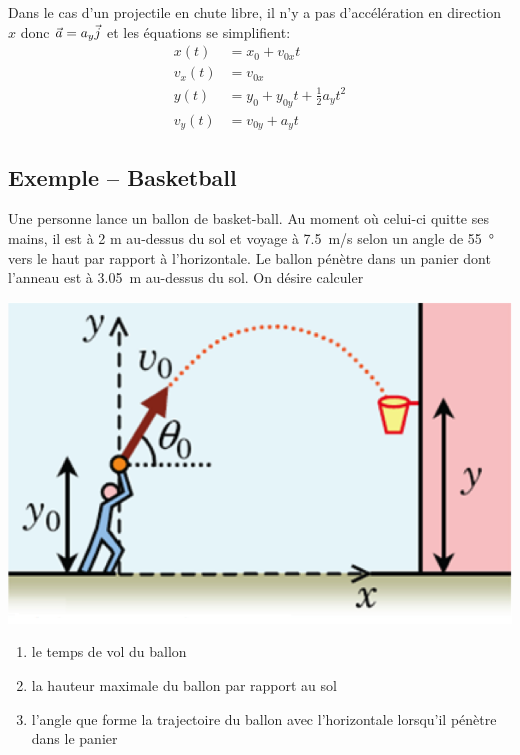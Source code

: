 Dans le cas d'un projectile en chute libre, il n'y a pas d'accélération en
direction $x$ donc $\vec{a} = a_y \vec{j}$ et les équations se simplifient:
\begin{align*}
  x(t)   &= x_0 + v_{0x} t \\
  v_x(t) &= v_{0x} \\
  y(t)   &= y_0 + y_{0y} t + \frac{1}{2} a_y t^2 \\
  v_y(t) &= v_{0y} + a_y t
\end{align*}


\subsection{Exemple -- Basketball}

Une personne lance un ballon de basket-ball.  Au moment où celui-ci quitte
ses mains, il est à 2 m au-dessus du sol et voyage à \SI{7.5}{m/s} selon un
angle de \SI{55}{\degree} vers le haut par rapport à l'horizontale.  Le
ballon pénètre dans un panier dont l'anneau est à \SI{3.05}{m} au-dessus du
sol.  On désire calculer
\begin{marginfigure}
  \includegraphics[scale=0.6]{03_Cinematique/basket.png}
\end{marginfigure}

\begin{enumerate}
  \item le temps de vol du ballon
  \item la hauteur maximale du ballon par rapport au sol
  \item l'angle que forme la trajectoire du ballon avec l'horizontale lorsqu'il
        pénètre dans le panier
\end{enumerate}


